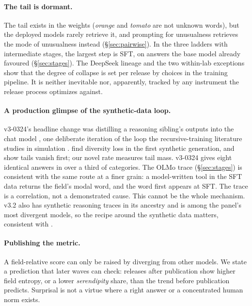\documentclass[11pt]{article}
\begin{document}
\paragraph{The tail is dormant.}
The tail exists in the weights (\emph{orange} and \emph{tomato} are not unknown words), but the deployed models rarely retrieve it, and prompting for unusualness retrieves the mode of unusualness instead (\S\ref{sec:pairwise}). In the three ladders with intermediate stages, the largest step is SFT, on answers the base model already favoured (\S\ref{sec:stages}). The DeepSeek lineage and the two within-lab exceptions show that the degree of collapse is set per release by choices in the training pipeline. It is neither inevitable nor, apparently, tracked by any instrument the release process optimizes against.

\paragraph{A production glimpse of the synthetic-data loop.}
v3-0324's headline change was distilling a reasoning sibling's outputs into the chat model \citep{deepseek2025changelog}, one deliberate iteration of the loop the recursive-training literature studies in simulation \citep{shumailov2024curse,guo2024curious}. \citet{guo2024curious} find diversity loss in the first synthetic generation, and \citet{shumailov2024curse} show tails vanish first; our novel rate measures tail mass. v3-0324 gives eight identical answers in over a third of categories. The OLMo trace (\S\ref{sec:stages}) is consistent with the same route at a finer grain: a model-written tool in the SFT data returns the field's modal word, and the word first appears at SFT. The trace is a correlation, not a demonstrated cause. This cannot be the whole mechanism. v3.2 also has synthetic reasoning traces in its ancestry and is among the panel's most divergent models, so the recipe around the synthetic data matters, consistent with \citet{karouzos2026where}.

\paragraph{Publishing the metric.}
A field-relative score can only be raised by diverging from other models. We state a prediction that later waves can check: releases after publication show higher field entropy, or a lower \emph{serendipity} share, than the trend before publication predicts. Surprisal is not a virtue where a right answer or a concentrated human norm exists.
\end{document}
